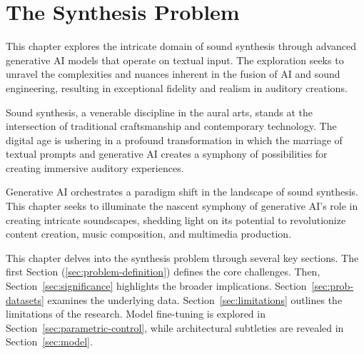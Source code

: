 \chapter{The Synthesis Problem}\label{chap:problem}

\minitoc

This chapter explores the intricate domain of sound synthesis through advanced generative \ac{AI} models that operate on textual input. The exploration seeks to unravel the complexities and nuances inherent in the fusion of \ac{AI} and sound engineering, resulting in exceptional fidelity and realism in auditory creations.

Sound synthesis, a venerable discipline in the aural arts, stands at the intersection of traditional craftsmanship and contemporary technology. The digital age is ushering in a profound transformation in which the marriage of textual prompts and generative \ac{AI} creates a symphony of possibilities for creating immersive auditory experiences.

Generative \ac{AI} orchestrates a paradigm shift in the landscape of sound synthesis. This chapter seeks to illuminate the nascent symphony of generative \ac{AI}'s role in creating intricate soundscapes, shedding light on its potential to revolutionize content creation, music composition, and multimedia production.

This chapter delves into the synthesis problem through several key sections. The first Section (\ref{sec:problem-definition}) defines the core challenges. Then, Section~\ref{sec:significance} highlights the broader implications. Section~\ref{sec:prob-datasets} examines the underlying data. Section~\ref{sec:limitations} outlines the limitations of the research. Model fine-tuning is explored in Section~\ref{sec:parametric-control}, while architectural subtleties are revealed in Section~\ref{sec:model}.







